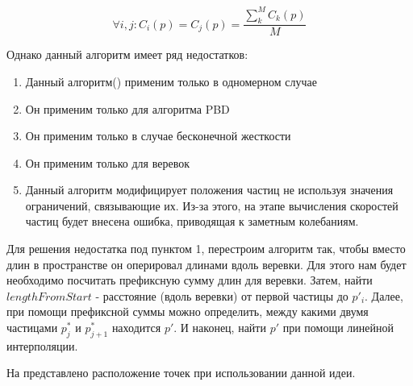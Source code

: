 	\begin{equation} \label{eq:heurV1Idea}
		\forall i,j : C_i(p) = C_j(p) = \frac{\sum_k^M C_k(p)}{M}
	\end{equation}
	
	Однако данный алгоритм имеет ряд недостатков:
	\begin{enumerate}[1.]
		\item Данный алгоритм() применим только в одномерном случае
		\item Он применим только для алгоритма PBD 
		\item Он применим только в случае бесконечной жесткости
		\item Он применим только для веревок
		\item Данный алгоритм модифицирует положения частиц не используя значения ограничений, связывающие их. Из-за этого, на этапе вычисления скоростей частиц будет внесена ошибка, приводящая к заметным колебаниям.
	\end{enumerate}
	
	Для решения недостатка под пунктом 1, перестроим алгоритм так, чтобы вместо длин в пространстве он оперировал длинами вдоль веревки. Для этого нам будет необходимо посчитать префиксную сумму длин для веревки. Затем, найти $lengthFromStart$ - расстояние (вдоль веревки) от первой частицы до $p'_i$. Далее, при помощи префиксной суммы можно определить, между какими двумя частицами $p^*_j$ и $p^*_{j+1}$  находится $p'$. И наконец, найти $p'$ при помощи линейной интерполяции.
	
	На  представлено расположение точек при использовании данной идеи.
	
